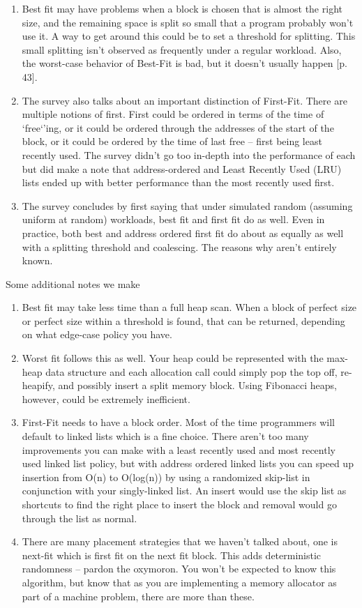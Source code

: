 \begin{enumerate}
\item Best fit may have problems when a block is chosen that is almost the right size, and the remaining space is split so small that a program probably won't use it.
  A way to get around this could be to set a threshold for splitting.
  This small splitting isn't observed as frequently under a regular workload.
  Also, the worst-case behavior of Best-Fit is bad, but it doesn't usually happen [p. 43].
\item The survey also talks about an important distinction of First-Fit.
  There are multiple notions of first.
  First could be ordered in terms of the time of `free`'ing, or it could be ordered through the addresses of the start of the block, or it could be ordered by the time of last free -- first being least recently used.
  The survey didn't go too in-depth into the performance of each but did make a note that address-ordered and Least Recently Used (LRU) lists ended up with better performance than the most recently used first.
\item The survey concludes by first saying that under simulated random (assuming uniform at random) workloads, best fit and first fit do as well. Even in practice, both best and address ordered first fit do about as equally as well with a splitting threshold and coalescing. The reasons why aren't entirely known.
\end{enumerate}

Some additional notes we make

\begin{enumerate}
\item Best fit may take less time than a full heap scan. When a block of perfect size or perfect size within a threshold is found, that can be returned, depending on what edge-case policy you have.
\item Worst fit follows this as well. Your heap could be represented with the max-heap data structure and each allocation call could simply pop the top off, re-heapify, and possibly insert a split memory block.
  Using Fibonacci heaps, however, could be extremely inefficient.
\item First-Fit needs to have a block order. Most of the time programmers will default to linked lists which is a fine choice. There aren't too many improvements you can make with a least recently used and most recently used linked list policy, but with address ordered linked lists you can speed up insertion from O(n) to O(log(n)) by using a randomized skip-list in conjunction with your singly-linked list.
  An insert would use the skip list as shortcuts to find the right place to insert the block and removal would go through the list as normal.
\item There are many placement strategies that we haven't talked about, one is next-fit which is first fit on the next fit block. This adds deterministic randomness -- pardon the oxymoron. You won't be expected to know this algorithm, but know that as you are implementing a memory allocator as part of a machine problem, there are more than these.
  \end{enumerate}

